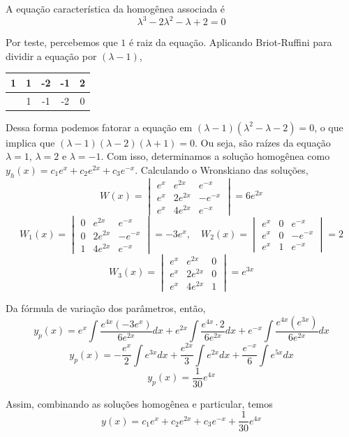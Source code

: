 \documentclass[oneside,12pt,a4paper]{report}
\begin{document}
\begin{resolucao}
    \itemresolucao A equação característica da homogênea associada é 
    \[\lambda^3-2\lambda^2-\lambda+2=0\]
    
    Por teste, percebemos que $1$ é raiz da equação. Aplicando Briot-Ruffini para dividir a equação por $(\lambda-1)$,

    \begin{table}[H]
        \centering
        \begin{tabular}{c|cccc}
            1 & 1 & -2 & -1 & 2\\
            \hline
              & 1 & -1 & -2 & 0
        \end{tabular}
    \end{table}

    Dessa forma podemos fatorar a equação em $(\lambda-1)(\lambda^2-\lambda-2)=0$, o que implica que $(\lambda-1)(\lambda-2)(\lambda+1)=0$. Ou seja, são raízes da equação $\lambda=1$, $\lambda=2$ e $\lambda=-1$. Com isso, determinamos a solução homogênea como $y_h(x)=c_1e^x+c_2e^{2x}+c_3e^{-x}$. Calculando o Wronskiano das soluções,
    \[W(x)=\begin{vmatrix}
        e^x & e^{2x} & e^{-x}\\
        e^x & 2e^{2x} & -e^{-x}\\
        e^x & 4e^{2x} & e^{-x}
    \end{vmatrix}=6e^{2x}\]
    \[W_1(x)=\begin{vmatrix}
        0 & e^{2x} & e^{-x}\\
        0 & 2e^{2x} & -e^{-x}\\
        1 & 4e^{2x} & e^{-x}
    \end{vmatrix}=-3e^x, 
    \quad W_2(x)=\begin{vmatrix}
        e^x & 0 & e^{-x}\\
        e^x & 0 & -e^{-x}\\
        e^x & 1 & e^{-x}
    \end{vmatrix}=2\]
    \[W_3(x)=\begin{vmatrix}
        e^x & e^{2x} &  0\\
        e^x & 2e^{2x} & 0\\
        e^x & 4e^{2x} & 1
    \end{vmatrix}=e^{3x}\]

    Da fórmula de variação dos parâmetros, então,
    \[y_p(x)=e^x\int\frac{e^{4x}(-3e^x)}{6e^{2x}}dx+e^{2x}\int\frac{e^{4x}\cdot2}{6e^{2x}}dx+e^{-x}\int\frac{e^{4x}(e^{3x})}{6e^{2x}}dx\]
    \[y_p(x)=-\frac{e^x}{2}\int e^{3x}dx+\frac{e^{2x}}{3}\int e^{2x}dx+\frac{e^{-x}}{6}\int e^{5x}dx\]
    \[y_p(x)=\frac{1}{30}e^{4x}\]

    Assim, combinando as soluções homogênea e particular, temos
    \[\boxed{y(x)=c_1e^x+c_2e^{2x}+c_3e^{-x}+\frac{1}{30}e^{4x}}\]

\end{resolucao}
\end{document}
